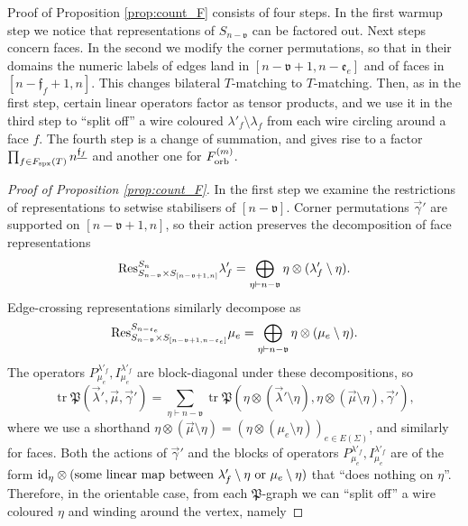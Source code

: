 \documentclass{amsart}
\newcommand{\Fspx}{F_{\textnormal{spx}}}
\newcommand{\Forb}[1][m]{F^{(#1)}_{\textnormal{orb}}}
\newcommand{\tn}{\textnormal}
\newcommand{\tr}{\operatorname{tr}}
\begin{document}
Proof of Proposition \ref{prop:count_F} consists of four steps. In the first warmup step we notice that representations of $S_{n-\mathfrak{v}}$ can be factored out. Next steps concern faces. In the second we modify the corner permutations, so that in their domains the numeric labels of edges land in $[n-\mathfrak{v}+1,n-\mathfrak{e}_e]$ and of faces in $[n-\mathfrak{f}_f+1,n]$. This changes bilateral $T$-matching to $T$-matching. Then, as in the first step, certain linear operators factor as tensor products, and we use it in the third step to ``split off'' a wire coloured $\lambda'_f\setminus\lambda_f$ from each wire circling around a face $f$. The fourth step is a change of summation, and gives rise to a factor $\prod_{f\in\Fspx(T)}n^{\underline{\mathfrak{f}_f}}$ and another one for $\Forb$.
\begin{proof}[Proof of Proposition \ref{prop:count_F}]
In the first step we examine the restrictions of representations to setwise stabilisers of $[n-\mathfrak{v}]$. Corner permutations $\vec\gamma'$ are supported on $[n-\mathfrak{v}+1,n]$, so their action preserves the decomposition of face representations
\begin{equation*}
\tn{Res}^{S_n}_{S_{n-\mathfrak{v}}\times S_{[n-\mathfrak{v}+1,n]}}\lambda'_f=\bigoplus_{\eta\vdash n-\mathfrak{v}}\eta\otimes(\lambda'_f\setminus\eta).
\end{equation*}
Edge-crossing representations similarly decompose as
\begin{equation*}
\tn{Res}^{S_{n-\mathfrak{e}_e}}_{S_{n-\mathfrak{v}}\times S_{[n-\mathfrak{v}+1,n-\mathfrak{e}_e]}}\mu_e=\bigoplus_{\eta\vdash n-\mathfrak{v}}\eta\otimes(\mu_e\setminus\eta).
\end{equation*}
The operators $P_{\mu_e}^{\lambda'_f},I_{\mu_e}^{\lambda'_f}$ are block-diagonal under these decompositions, so
\begin{equation}\label{eq:separate_eta}
\tr\mathfrak{P}(\vec\lambda',\vec\mu,\vec\gamma')=\sum_{\eta\vdash n-\mathfrak{v}}\tr\mathfrak{P}\left(\eta\otimes(\vec\lambda'\setminus\eta),\eta\otimes(\vec\mu\setminus\eta),\vec\gamma'\right),
\end{equation}
where we use a shorthand $\eta\otimes(\vec\mu\setminus\eta)=\left(\eta\otimes(\mu_e\setminus\eta)\right)_{e\in E(\Sigma)}$, and similarly for faces. Both the actions of $\vec\gamma'$ and the blocks of operators $P_{\mu_e}^{\lambda'_f},I_{\mu_e}^{\lambda'_f}$ are of the form $\tn{id}_\eta\otimes(\text{some linear map between }\lambda'_f\setminus\eta\text{ or }\mu_e\setminus\eta)$ that ``does nothing on $\eta$''. Therefore, in the orientable case, from each $\mathfrak{P}$-graph we can ``split off'' a wire coloured $\eta$ and winding around the vertex, namely

\end{proof}
\end{document}
